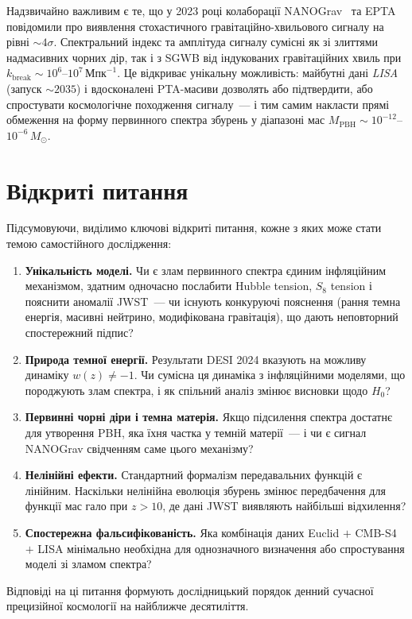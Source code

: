 Надзвичайно важливим є те, що у 2023 році колаборації NANOGrav~\cite{NANOGrav2023} та EPTA повідомили про виявлення стохастичного гравітаційно-хвильового сигналу на рівні $\sim 4\sigma$. Спектральний індекс та амплітуда сигналу сумісні як зі злиттями надмасивних чорних дір, так і з SGWB від індукованих гравітаційних хвиль при $k_\mathrm{break} \sim 10^6$--$10^7\,\text{Мпк}^{-1}$. Це відкриває унікальну можливість: майбутні дані \emph{LISA} (запуск $\sim 2035$) і вдосконалені PTA-масиви дозволять або підтвердити, або спростувати космологічне походження сигналу~--- і тим самим накласти прямі обмеження на форму первинного спектра збурень у діапазоні мас $M_\mathrm{PBH} \sim 10^{-12}$--$10^{-6}\,M_\odot$.

\section*{Відкриті питання}
\label{sec:open_questions}

Підсумовуючи, виділимо ключові відкриті питання, кожне з яких може стати темою самостійного дослідження:

\begin{enumerate}
  \item \textbf{Унікальність моделі.} Чи є злам первинного спектра єдиним інфляційним механізмом, здатним одночасно послабити Hubble tension, $S_8$ tension і пояснити аномалії JWST~--- чи існують конкуруючі пояснення (рання темна енергія, масивні нейтрино, модифікована гравітація), що дають неповторний спостережний підпис?

  \item \textbf{Природа темної енергії.} Результати DESI 2024 вказують на можливу динаміку $w(z) \neq -1$. Чи сумісна ця динаміка з інфляційними моделями, що породжують злам спектра, і як спільний аналіз змінює висновки щодо $H_0$?

  \item \textbf{Первинні чорні діри і темна матерія.} Якщо підсилення спектра достатнє для утворення PBH, яка їхня частка у темній матерії~--- і чи є сигнал NANOGrav свідченням саме цього механізму?

  \item \textbf{Нелінійні ефекти.} Стандартний формалізм передавальних функцій є лінійним. Наскільки нелінійна еволюція збурень змінює передбачення для функції мас гало при $z > 10$, де дані JWST виявляють найбільші відхилення?

  \item \textbf{Спостережна фальсифікованість.} Яка комбінація даних Euclid $+$ CMB-S4 $+$ LISA мінімально необхідна для однозначного визначення або спростування моделі зі зламом спектра?
\end{enumerate}

Відповіді на ці питання формують дослідницький порядок денний сучасної прецизійної космології на найближче десятиліття.